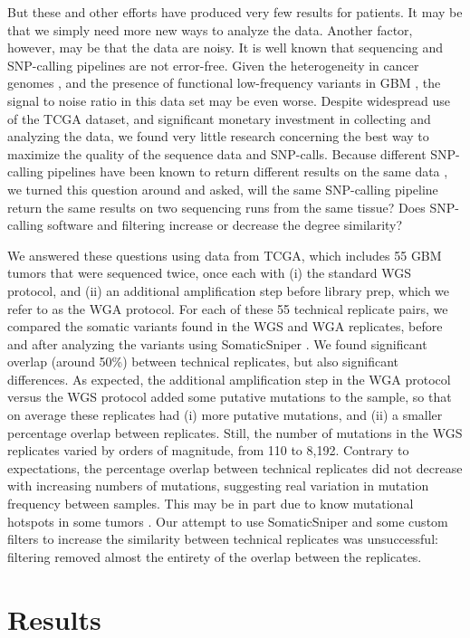 \documentclass[11pt]{article} %
\begin{document}
But these and other efforts have produced very few results for patients. It may be that we simply need more new ways to analyze the data. Another factor, however, may be that the data are noisy. It is well known that sequencing and SNP-calling pipelines are not error-free. Given the heterogeneity in cancer genomes \citep{heterogenous1, heterogenous2}, and the presence of functional low-frequency variants in GBM \citep{rare}, the signal to noise ratio in this data set may be even worse. Despite widespread use of the TCGA dataset, and significant monetary investment in collecting and analyzing the data, we found very little research concerning the best way to maximize the quality of the sequence data and SNP-calls. Because different SNP-calling pipelines have been known to return different results on the same data \citep{SNPcall}, we turned this question around and asked, will the same SNP-calling pipeline return the same results on two sequencing runs from the same tissue? Does SNP-calling software and filtering increase or decrease the degree similarity? 

We answered these questions using data from TCGA, which includes 55 GBM tumors that were sequenced twice, once each with (i) the standard WGS protocol, and (ii) an additional amplification step before library prep, which we refer to as the WGA protocol. For each of these 55 technical replicate pairs, we compared the somatic variants found in the WGS and WGA replicates, before and after analyzing the variants using SomaticSniper \citep{SomaticSniper}. We found significant overlap (around 50\%) between technical replicates, but also significant differences. As expected, the additional amplification step in the WGA protocol versus the WGS protocol added some putative mutations to the sample, so that on average these replicates had (i) more putative mutations, and (ii) a smaller percentage overlap between replicates. Still, the number of mutations in the WGS replicates varied by orders of magnitude, from 110 to 8,192. Contrary to expectations, the percentage overlap between technical replicates did not decrease with increasing numbers of mutations, suggesting real variation in mutation frequency between samples. This may be in part due to know mutational hotspots in some tumors \citep{Karen}. Our attempt to use SomaticSniper and some custom filters to increase the similarity between technical replicates was unsuccessful: filtering removed almost the entirety of the overlap between the replicates.

\section*{Results}
\end{document}
